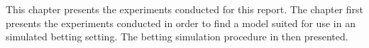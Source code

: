 This chapter presents the experiments conducted for this report. The chapter first presents the experiments conducted in order to find a model suited for use in an simulated betting setting. The betting simulation procedure in then presented.
